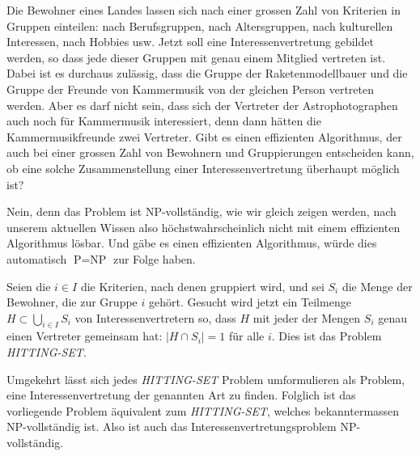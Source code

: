 Die Bewohner eines Landes lassen sich nach einer grossen Zahl
von Kriterien in Gruppen einteilen: nach Berufsgruppen, nach
Altersgruppen, nach kulturellen Interessen, nach Hobbies usw.
Jetzt soll eine Interessenvertretung gebildet werden, so dass
jede dieser Gruppen mit genau einem Mitglied vertreten ist.
Dabei ist es durchaus zulässig, dass die Gruppe der Raketenmodellbauer
und die Gruppe der Freunde von Kammermusik von der gleichen Person
vertreten werden. Aber es darf nicht sein, dass sich der Vertreter
der Astrophotographen auch noch für Kammermusik interessiert, denn
dann hätten die Kammermusikfreunde zwei Vertreter.
Gibt es einen effizienten Algorithmus, der auch bei einer grossen
Zahl von Bewohnern und Gruppierungen entscheiden kann, ob eine
solche Zusammenstellung einer Interessenvertretung überhaupt
möglich ist?


\begin{loesung}
Nein, denn das Problem ist NP-vollständig, wie wir gleich
zeigen werden, nach unserem aktuellen
Wissen also höchstwahrscheinlich nicht mit einem effizienten
Algorithmus lösbar. Und gäbe es einen effizienten Algorithmus,
würde dies automatisch $\text{P}=\text{NP}$ zur Folge haben.

Seien die $i\in I$ die Kriterien, nach denen gruppiert wird,
und sei $S_i$ die Menge der Bewohner, die zur Gruppe $i$ gehört.
Gesucht wird jetzt ein Teilmenge $H\subset\bigcup_{i\in I}S_i$
von Interessenvertretern so, dass $H$ mit jeder der Mengen
$S_i$ genau einen Vertreter gemeinsam hat: $|H\cap S_i|=1$
für alle $i$. Dies ist das Problem {\textsl{HITTING-SET}}. 

Umgekehrt lässt sich jedes {\textsl{HITTING-SET}} Problem umformulieren
als Problem, eine Interessenvertretung der genannten Art zu finden.
Folglich ist das vorliegende Problem äquivalent zum {\textsl{HITTING-SET}},
welches bekanntermassen NP-vollständig ist. Also ist auch das
Interessenvertretungsproblem NP-vollständig.
\end{loesung}
